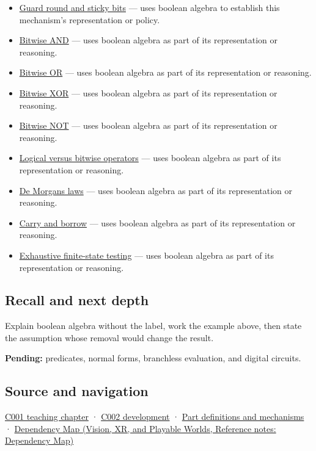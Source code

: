 \begin{itemize}
\item
  \hyperref[appendix-b572b631069b]{Guard round and sticky bits} --- uses boolean algebra to establish this mechanism's representation or policy.
\item
  \hyperref[appendix-68b52453737c]{Bitwise AND} --- uses boolean algebra as part of its representation or reasoning.
\item
  \hyperref[appendix-a427ce8ce8a6]{Bitwise OR} --- uses boolean algebra as part of its representation or reasoning.
\item
  \hyperref[appendix-d49161831368]{Bitwise XOR} --- uses boolean algebra as part of its representation or reasoning.
\item
  \hyperref[appendix-8f38927cfc54]{Bitwise NOT} --- uses boolean algebra as part of its representation or reasoning.
\item
  \hyperref[appendix-fe6b457d68d8]{Logical versus bitwise operators} --- uses boolean algebra as part of its representation or reasoning.
\item
  \hyperref[appendix-9079d3659da4]{De Morgan\textquotesingle s laws} --- uses boolean algebra as part of its representation or reasoning.
\item
  \hyperref[appendix-d52d5f78ffd1]{Carry and borrow} --- uses boolean algebra as part of its representation or reasoning.
\item
  \hyperref[appendix-05db24ccc28a]{Exhaustive finite-state testing} --- uses boolean algebra as part of its representation or reasoning.
\end{itemize}

\subsection{Recall and next depth}\label{appendix-24475e1596a8-recall-and-next-depth}

\hypertarget{appendix-24475e1596a8-recall-and-next-depth}{}

Explain boolean algebra without the label, work the example above, then state the assumption whose removal would change the result.

\textbf{Pending:} predicates, normal forms, branchless evaluation, and digital circuits.

\subsection{Source and navigation}\label{appendix-24475e1596a8-source-and-navigation}

\hypertarget{appendix-24475e1596a8-source-and-navigation}{}

\hyperref[01-foundations-i-ch001-from-a-signal-to-an-interpretation]{C001 teaching chapter} · \hyperref[01-foundations-i-ch001-arithmetic-becomes-a-policy]{C002 development} · \hyperref[appendix-fd090d982a15]{Part definitions and mechanisms} · \href{../07-Vision-XR-and-Playable-Worlds/main.pdf\#nameddest=appendix-4ad47bdd269a}{Dependency Map (Vision, XR, and Playable Worlds, Reference notes: Dependency Map)}

